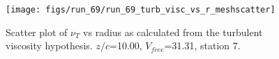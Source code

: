 \begin{figure}[H]
\centering
\texttt{[image: figs/run\_69/run\_69\_turb\_visc\_vs\_r\_meshscatter]}
\caption{Scatter plot of $\nu_T$ vs radius as calculated from the turbulent viscosity hypothesis. $z/c$=10.00, $V_{free}$=31.31, station 7.}
\label{fig:run_69_turb_visc_vs_r_meshscatter}
\end{figure}


